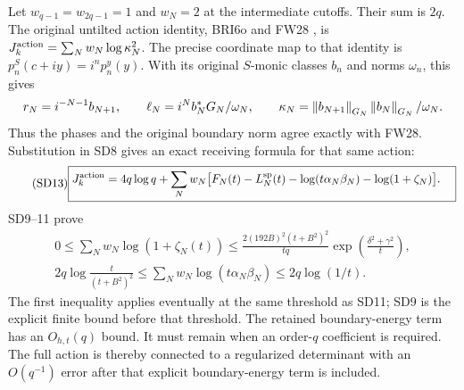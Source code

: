 \documentclass[11pt]{article}
\begin{document}
Let $w_{q-1}=w_{2q-1}=1$ and $w_N=2$ at the intermediate cutoffs.
Their sum is $2q$. The original untilted action identity, BRI6o and
FW28 \cite{osd:FW}, is $J_k^{\rm action}=\sum_Nw_N\log\kappa_N^2$.
The precise coordinate map to that identity is
$p_n^S(c+iy)=i^np_n^y(y)$. With its original $S$-monic classes $b_n$
and norms $\omega_n$, this gives
\[
r_N=i^{-N-1}b_{N+1},\qquad
\ell_N=i^N b_N^*G_N/\omega_N,\qquad
\kappa_N=\left\lVert b_{N+1}\right\rVert_{G_N}\left\lVert b_N\right\rVert_{G_N}/\omega_N.
\]
Thus the phases and the original boundary norm agree exactly with FW28.
Substitution in SD8 gives an exact receiving formula for that same
action:
\begin{equation}\tag{SD13}
\boxed{\begin{aligned}
J_k^{\rm action}={}&4q\log q+
\sum_Nw_N\bigl[F_N(t)-L_N^{\rm sp}(t)
-\log(t\alpha_N\beta_N)-\log(1+\zeta_N)\bigr].
\end{aligned}}
\end{equation}
SD9--11 prove
\begin{equation}\tag{SD14}
\begin{gathered}
0\le\sum_Nw_N\log(1+\zeta_N(t))
\le\frac{2(192B)^2(t+B^2)^2}{tq}
\exp\!\left(\frac{\delta^2+\gamma^2}{t}\right),\\
2q\log\frac{t}{(t+B^2)^2}
\le\sum_Nw_N\log(t\alpha_N\beta_N)
\le2q\log(1/t).
\end{gathered}
\end{equation}
The first inequality applies eventually at the same threshold as SD11;
SD9 is the explicit finite bound before that threshold. The retained
boundary-energy term has an $O_{h,t}(q)$ bound. It must remain when an
order-$q$ coefficient is required. The full action is thereby connected
to a regularized determinant with an $O(q^{-1})$ error after that
explicit boundary-energy term is included.
\end{document}
